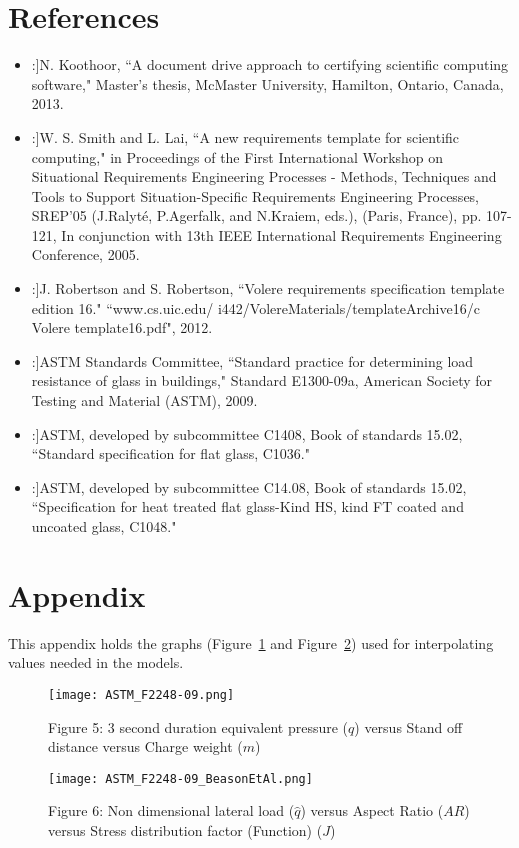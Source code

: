 \documentclass[12pt]{article}
\begin{document}
\section{References}
\label{Sec:Refe}
\begin{itemize}
\item[[1]:]N. Koothoor, ``A document drive approach to certifying scientific computing software," Master's thesis, McMaster University, Hamilton, Ontario, Canada, 2013.
\item[[2]:]W. S. Smith and L. Lai, ``A new requirements template for scientific computing," in Proceedings of the First International Workshop on Situational Requirements Engineering Processes - Methods, Techniques and Tools to Support Situation-Specific Requirements Engineering Processes, SREP'05 (J.Ralyt\'{e}, P.Agerfalk, and N.Kraiem, eds.), (Paris, France), pp. 107-121, In conjunction with 13th IEEE International Requirements Engineering Conference, 2005.
\item[[3]:]J. Robertson and S. Robertson, ``Volere requirements specification template edition 16." ``www.cs.uic.edu/ i442/VolereMaterials/templateArchive16/c Volere template16.pdf", 2012.
\item[[4]:]ASTM Standards Committee, ``Standard practice for determining load resistance of glass in buildings," Standard E1300-09a, American Society for Testing and Material (ASTM), 2009.
\item[[5]:]ASTM, developed by subcommittee C1408, Book of standards 15.02, ``Standard specification for flat glass, C1036."
\item[[6]:]ASTM, developed by subcommittee C14.08, Book of standards 15.02, ``Specification for heat treated flat glass-Kind HS, kind FT coated and uncoated glass, C1048."
\end{itemize}
\section{Appendix}
\label{Sec:Appe}
This appendix holds the graphs (Figure~\ref{Figure:Figu5:3secoduraequipres()versStanoffdistversCharweig()} and Figure~\ref{Figure:Figu6:Nondimelateload()versAspeRati()versStredistfact(Fun()}) used for interpolating values needed in the models.
\begin{figure}
\begin{center}
\texttt{[image: ASTM\_F2248-09.png]}
\caption{Figure 5: 3 second duration equivalent pressure ($q$) versus Stand off distance versus Charge weight ($m$)}
\label{Figure:Figu5:3secoduraequipres()versStanoffdistversCharweig()}
\end{center}
\end{figure}
\begin{figure}
\begin{center}
\texttt{[image: ASTM\_F2248-09\_BeasonEtAl.png]}
\caption{Figure 6: Non dimensional lateral load ($\hat{q}$) versus Aspect Ratio ($AR$) versus Stress distribution factor (Function) ($J$)}
\label{Figure:Figu6:Nondimelateload()versAspeRati()versStredistfact(Fun()}
\end{center}
\end{figure}
\end{document}
